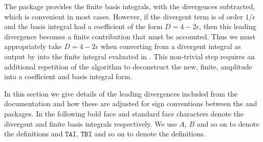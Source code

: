 The \tsil package provides the finite basis integrals, with the divergences subtracted, which is convenient in most cases.  However, if the divergent term is of order $1/\epsilon$ and the basis integral had a coefficient of the form $D = 4-2\epsilon$, then this leading divergence becomes a finite contribution that must be accounted.  Thus we must appropriately take $D=4-2\epsilon$ when converting from a divergent integral as output by \tarcer into the finite integral evaluated in \tsil.  This non-trivial step requires an additional repetition of the algorithm to deconstruct the new, finite, amplitude into a coefficient and basis integral form.

In this section we give details of the leading divergences included from the \tsil documentation and how these are adjusted for sign conventions between the \tarcer and \tsil packages.  In the following bold face and standard face characters denote the divergent and finite basis integrals respectively.  We use $A$, $B$ and so on to denote the \tsil definitions and $\mathtt{TAI}$, $\mathtt{TBI}$ and so on to denote the \tarcer definitions.

